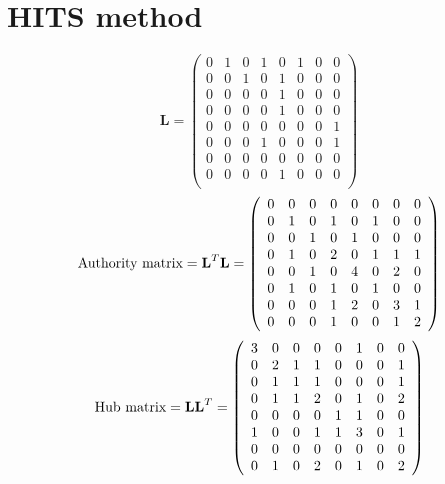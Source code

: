 \documentclass[11pt]{report}
\begin{document}
\section{HITS method}
\begin{equation}
\textbf{L}=\left(
\begin{array}{cccccccc}
0 & 1 & 0 & 1 & 0 & 1 & 0 & 0 \\
0 & 0 & 1 & 0 & 1 & 0 & 0 & 0 \\
0 & 0 & 0 & 0 & 1 & 0 & 0 & 0 \\
0 & 0 & 0 & 0 & 1 & 0 & 0 & 0 \\
0 & 0 & 0 & 0 & 0 & 0 & 0 & 1 \\
0 & 0 & 0 & 1 & 0 & 0 & 0 & 1 \\
0 & 0 & 0 & 0 & 0 & 0 & 0 & 0 \\
0 & 0 & 0 & 0 & 1 & 0 & 0 & 0 \\
\end{array}
\right)
\end{equation}
\begin{equation}
\textnormal{Authority matrix} = \textbf{L}^T\textbf{L}=\left(
\begin{array}{cccccccc}
0 & 0 & 0 & 0 & 0 & 0 & 0 & 0 \\
0 & 1 & 0 & 1 & 0 & 1 & 0 & 0 \\
0 & 0 & 1 & 0 & 1 & 0 & 0 & 0 \\
0 & 1 & 0 & 2 & 0 & 1 & 1 & 1 \\
0 & 0 & 1 & 0 & 4 & 0 & 2 & 0 \\
0 & 1 & 0 & 1 & 0 & 1 & 0 & 0 \\
0 & 0 & 0 & 1 & 2 & 0 & 3 & 1 \\
0 & 0 & 0 & 1 & 0 & 0 & 1 & 2 \\
\end{array}
\right)
\end{equation}
\begin{equation}
\textnormal{Hub matrix} = \textbf{LL}^T=\left(
\begin{array}{cccccccc}
3 & 0 & 0 & 0 & 0 & 1 & 0 & 0 \\
0 & 2 & 1 & 1 & 0 & 0 & 0 & 1 \\
0 & 1 & 1 & 1 & 0 & 0 & 0 & 1 \\
0 & 1 & 1 & 2 & 0 & 1 & 0 & 2 \\
0 & 0 & 0 & 0 & 1 & 1 & 0 & 0 \\
1 & 0 & 0 & 1 & 1 & 3 & 0 & 1 \\
0 & 0 & 0 & 0 & 0 & 0 & 0 & 0 \\
0 & 1 & 0 & 2 & 0 & 1 & 0 & 2 \\
\end{array}
\right)
\end{equation}
\end{document}
